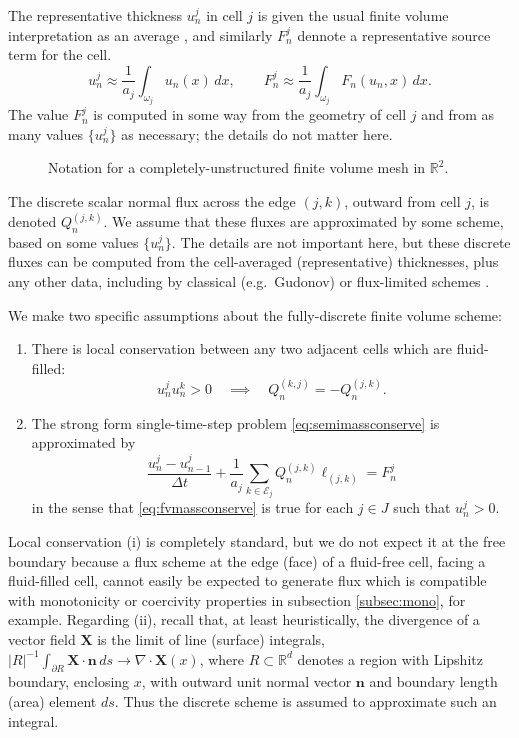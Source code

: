 \documentclass[final,leqno,onefignum,onetabnum]{siamltex1213bueler}
\newcommand\bn{\mathbf{n}}
\newcommand\bX{\mathbf{X}}
\newcommand{\Div}{\nabla\cdot}
\newcommand\RR{\mathbb{R}}
\begin{document}
The representative thickness $u_n^j$ in cell $j$ is given the usual finite volume interpretation as an average \cite{LeVeque2002}, and similarly $F_n^j$ dennote a representative source term for the cell.
\begin{equation}
u_n^j \approx \frac{1}{a_j} \int_{\omega_j} u_n(x)\,dx, \qquad F_n^j \approx \frac{1}{a_j} \int_{\omega_j} F_n(u_n,x)\,dx.  \label{eq:fvthickness}
\end{equation}
The value $F_n^j$ is computed in some way from the geometry of cell $j$ and from as many values $\{u_n^j\}$ as necessary; the details do not matter here.

\begin{figure}[ht]
\begin{center}

\end{center}
\caption{Notation for a completely-unstructured finite volume mesh in $\RR^2$.}
\label{fig:fvmesh-notation}
\end{figure}

The discrete scalar normal flux across the edge $(j,k)$, outward from cell $j$, is denoted $Q_n^{(j,k)}$.  We assume that these fluxes are approximated by some scheme, based on some values $\{u_n^j\}$.  The details are not important here, but these discrete fluxes can be computed from the cell-averaged (representative) thicknesses, plus any other data, including by classical (e.g.~Gudonov) or flux-limited schemes \cite{LeVeque2002}.

We make two specific assumptions about the fully-discrete finite volume scheme:\begin{enumerate}
\item There is local conservation between any two adjacent cells which are fluid-filled:
\begin{equation}
  u_n^j u_n^k > 0 \quad \implies \quad Q_n^{(k,j)}=-Q_n^{(j,k)}.  \label{eq:fvlocalconservation}
\end{equation}
\item The strong form single-time-step problem \eqref{eq:semimassconserve} is approximated by
\begin{equation}
\frac{u_n^j - u_{n-1}^j}{\Delta t} + \frac{1}{a_j} \sum_{k\in \mathcal{E}_j} Q_n^{(j,k)} \ell_{(j,k)} = F_n^j \label{eq:fvmassconserve}
\end{equation}
in the sense that \eqref{eq:fvmassconserve} is true for each $j\in J$ such that $u_n^j > 0$.
\end{enumerate}

Local conservation (i) is completely standard, but we do not expect it at the free boundary because a flux scheme at the edge (face) of a fluid-free cell, facing a fluid-filled cell, cannot easily be expected to generate flux which is compatible with monotonicity or coercivity properties in subsection \ref{subsec:mono}, for example.  Regarding (ii), recall that, at least heuristically, the divergence of a vector field $\bX$ is the limit of line (surface) integrals, $|R|^{-1} \int_{\partial R} \bX\cdot \bn\,ds \to \Div \bX(x)$, where $R\subset \RR^d$ denotes a region with Lipshitz boundary, enclosing $x$, with outward unit normal vector $\bn$ and boundary length (area) element $ds$.  Thus the discrete scheme is assumed to approximate such an integral. 
\end{document}
